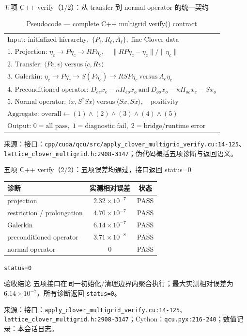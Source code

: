 \documentclass[UTF8,aspectratio=169,11pt]{ctexbeamer}
\newcommand{\source}[1]{%
  \vspace{0.06em}\par{\raggedright\scriptsize\color{muted}来源：#1\par}}
\newcommand{\code}[1]{\nolinkurl{#1}}
\newcommand{\passmark}{\textcolor{evidence}{PASS}}
\begin{document}
\begin{frame}[t]{五项 C++ verify（1/2）：从 transfer 到 normal operator 的统一契约}
  \begin{table}[htbp]
    \centering
    \caption*{Pseudocode — complete C++ multigrid verify() contract}
    \small
    \renewcommand{\arraystretch}{0.82}
    \begin{tabular}{@{}l@{}}
      $\text{Input: }\text{initialized hierarchy},\;\{P_\ell,R_\ell,A_\ell\},\;\text{fine Clover data}$ \\
      $\text{1. Projection: }\eta_c\to P\eta_c\to RP\eta_c,\quad\|RP\eta_c-\eta_c\|/\|\eta_c\|$ \\
      $\text{2. Transfer: }\langle Pc,v\rangle\ \text{versus}\ \langle c,Rv\rangle$ \\
      $\text{3. Galerkin: }\eta_c\to P\eta_c\to S(P\eta_c)\to RSP\eta_c\ \text{versus}\ A_c\eta_c$ \\
      $\text{4. Preconditioned operator: }D_{ee}x_e-\kappa H_{eo}x_o\ \text{and}\ D_{oo}x_o-\kappa H_{oe}x_e-Sx_o$ \\
      $\text{5. Normal operator: }\langle x,S^\dagger Sx\rangle\ \text{versus}\ \langle Sx,Sx\rangle,\quad\text{positivity}$ \\
      $\text{Aggregate: }\text{overall}\gets(1)\land(2)\land(3)\land(4)\land(5)$ \\
      $\text{Output: }0=\text{all pass},\;1=\text{diagnostic fail},\;2=\text{bridge/runtime error}$
    \end{tabular}
  \end{table}
  \source{接口：\code{cpp/cuda/qcu/src/apply_clover_multigrid_verify.cu:14-125}、\code{lattice_clover_multigrid.h:2908-3147}；伪代码概括五项诊断与返回语义。}
\end{frame}

\begin{frame}[t]{五项 C++ verify（2/2）：五项误差均通过，接口返回 status=0}
  \begin{center}
    \small
    \begin{tabular}{@{}lcc@{}}
      \toprule
      诊断 & 实测相对误差 & 状态 \\
      \midrule
      projection & $2.32\times10^{-7}$ & \passmark{} \\
      restriction / prolongation & $4.70\times10^{-7}$ & \passmark{} \\
      Galerkin & $6.14\times10^{-7}$ & \passmark{} \\
      preconditioned operator & $3.71\times10^{-8}$ & \passmark{} \\
      normal operator & $0$ & \passmark{} \\
      \bottomrule
    \end{tabular}\quad\texttt{status=0}
  \end{center}
  \begin{block}{验收结论}
    \small
    五项接口在同一初始化/清理边界内聚合执行；最大实测相对误差为
    $6.14\times10^{-7}$，所有诊断返回 \code{status=0}。
  \end{block}
  \source{接口：\code{apply_clover_multigrid_verify.cu:14-125}、\code{lattice_clover_multigrid.h:2908-3147}；Cython：\code{qcu.pyx:216-240}；数值记录：本会话日志。}
\end{frame}
\end{document}

